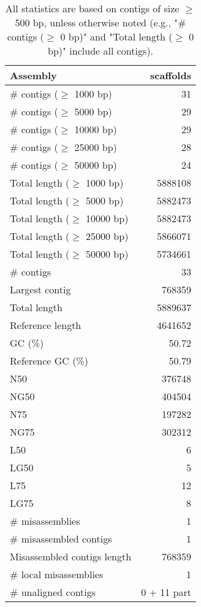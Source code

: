 \documentclass[12pt,a4paper]{article}
\begin{document}
\begin{table}[ht]
\begin{center}
\caption{All statistics are based on contigs of size $\geq$ 500 bp, unless otherwise noted (e.g., "\# contigs ($\geq$ 0 bp)" and "Total length ($\geq$ 0 bp)" include all contigs).}
\begin{tabular}{|l*{1}{|r}|}
\hline
Assembly & scaffolds \\ \hline
\# contigs ($\geq$ 1000 bp) & 31 \\ \hline
\# contigs ($\geq$ 5000 bp) & 29 \\ \hline
\# contigs ($\geq$ 10000 bp) & 29 \\ \hline
\# contigs ($\geq$ 25000 bp) & 28 \\ \hline
\# contigs ($\geq$ 50000 bp) & 24 \\ \hline
Total length ($\geq$ 1000 bp) & 5888108 \\ \hline
Total length ($\geq$ 5000 bp) & 5882473 \\ \hline
Total length ($\geq$ 10000 bp) & 5882473 \\ \hline
Total length ($\geq$ 25000 bp) & 5866071 \\ \hline
Total length ($\geq$ 50000 bp) & 5734661 \\ \hline
\# contigs & 33 \\ \hline
Largest contig & 768359 \\ \hline
Total length & 5889637 \\ \hline
Reference length & 4641652 \\ \hline
GC (\%) & 50.72 \\ \hline
Reference GC (\%) & 50.79 \\ \hline
N50 & 376748 \\ \hline
NG50 & 404504 \\ \hline
N75 & 197282 \\ \hline
NG75 & 302312 \\ \hline
L50 & 6 \\ \hline
LG50 & 5 \\ \hline
L75 & 12 \\ \hline
LG75 & 8 \\ \hline
\# misassemblies & 1 \\ \hline
\# misassembled contigs & 1 \\ \hline
Misassembled contigs length & 768359 \\ \hline
\# local misassemblies & 1 \\ \hline
\# unaligned contigs & 0 + 11 part \\ \hline

\end{tabular}
\end{center}
\end{table}
\end{document}
